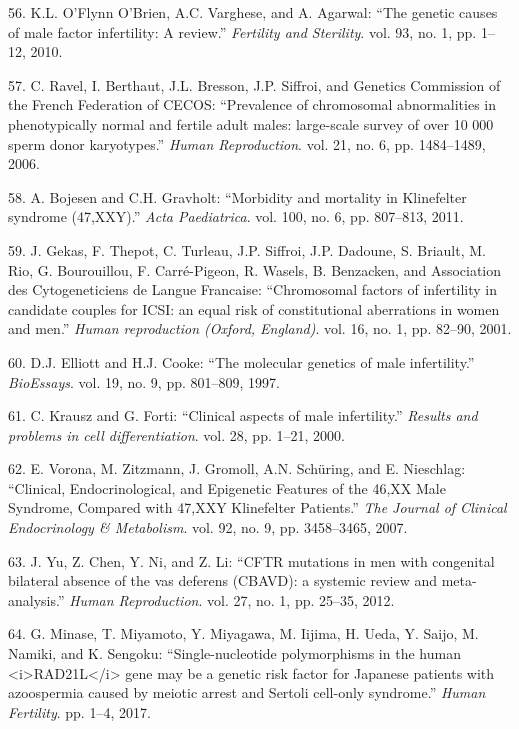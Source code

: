 \documentclass[12pt,a4paper,twoside]{ugathesis}
\theoremstyle{definition}
\theoremstyle{definition}
\theoremstyle{definition}
\theoremstyle{remark}
\begin{document}
\hypertarget{ref-OFlynnOBrien2010}{}
56. K.L. O'Flynn O'Brien, A.C. Varghese, and A. Agarwal: ``The genetic
causes of male factor infertility: A review.'' \emph{Fertility and
Sterility}. vol. 93, no. 1, pp. 1--12, 2010.

\hypertarget{ref-Ravel2006}{}
57. C. Ravel, I. Berthaut, J.L. Bresson, J.P. Siffroi, and Genetics
Commission of the French Federation of CECOS: ``Prevalence of
chromosomal abnormalities in phenotypically normal and fertile adult
males: large-scale survey of over 10 000 sperm donor karyotypes.''
\emph{Human Reproduction}. vol. 21, no. 6, pp. 1484--1489, 2006.

\hypertarget{ref-Bojesen2011}{}
58. A. Bojesen and C.H. Gravholt: ``Morbidity and mortality in
Klinefelter syndrome (47,XXY).'' \emph{Acta Paediatrica}. vol. 100, no.
6, pp. 807--813, 2011.

\hypertarget{ref-Gekas2001}{}
59. J. Gekas, F. Thepot, C. Turleau, J.P. Siffroi, J.P. Dadoune, S.
Briault, M. Rio, G. Bourouillou, F. Carré-Pigeon, R. Wasels, B.
Benzacken, and Association des Cytogeneticiens de Langue Francaise:
``Chromosomal factors of infertility in candidate couples for ICSI: an
equal risk of constitutional aberrations in women and men.'' \emph{Human
reproduction (Oxford, England)}. vol. 16, no. 1, pp. 82--90, 2001.

\hypertarget{ref-Elliott1997}{}
60. D.J. Elliott and H.J. Cooke: ``The molecular genetics of male
infertility.'' \emph{BioEssays}. vol. 19, no. 9, pp. 801--809, 1997.

\hypertarget{ref-Krausz2000}{}
61. C. Krausz and G. Forti: ``Clinical aspects of male infertility.''
\emph{Results and problems in cell differentiation}. vol. 28, pp. 1--21,
2000.

\hypertarget{ref-Vorona2007}{}
62. E. Vorona, M. Zitzmann, J. Gromoll, A.N. Schüring, and E. Nieschlag:
``Clinical, Endocrinological, and Epigenetic Features of the 46,XX Male
Syndrome, Compared with 47,XXY Klinefelter Patients.'' \emph{The Journal
of Clinical Endocrinology \& Metabolism}. vol. 92, no. 9, pp.
3458--3465, 2007.

\hypertarget{ref-Yu2012}{}
63. J. Yu, Z. Chen, Y. Ni, and Z. Li: ``CFTR mutations in men with
congenital bilateral absence of the vas deferens (CBAVD): a systemic
review and meta-analysis.'' \emph{Human Reproduction}. vol. 27, no. 1,
pp. 25--35, 2012.

\hypertarget{ref-Minase2017}{}
64. G. Minase, T. Miyamoto, Y. Miyagawa, M. Iijima, H. Ueda, Y. Saijo,
M. Namiki, and K. Sengoku: ``Single-nucleotide polymorphisms in the
human \textless{}i\textgreater{}RAD21L\textless{}/i\textgreater{} gene
may be a genetic risk factor for Japanese patients with azoospermia
caused by meiotic arrest and Sertoli cell-only syndrome.'' \emph{Human
Fertility}. pp. 1--4, 2017.
\end{document}
